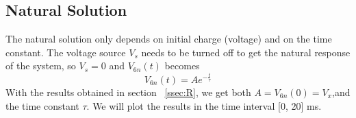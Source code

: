 \subsection{Natural Solution}
\label{ssec:n}
The natural solution only depends on initial charge (voltage) and on the time constant. The voltage source $V_s$ needs to be turned off to get the natural response of the system, so $V_s=0$ and  $V_{6n}(t)$ becomes
\begin{equation}
  V_{6n}(t) = Ae^{-\frac{t}{\tau}}
\end{equation}
With the results obtained in section ~\ref{ssec:R}, we get both $A=V_{6n}(0)=V_x$,and the time constant $\tau$. We will plot the results in the time interval [0, 20] ms. \\

